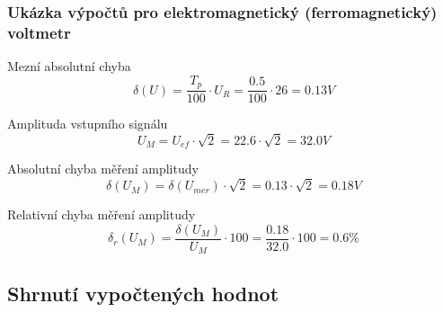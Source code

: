 \documentclass{praktikum}
\begin{document}
\subsubsection{Ukázka výpočtů pro elektromagnetický (ferromagnetický) voltmetr}
Mezní absolutní chyba
\begin{equation}
\label{eqn:vypocet_jedno_meznichyba}
\delta (U) = \frac{T_p}{100}\cdot U_R = \frac{0.5}{100}\cdot 26=0.13V
\end{equation}

Amplituda vstupního signálu
\begin{equation}
\label{eqn:vypocet_jedno_amplituda}
U_M = U_{ef} \cdot \sqrt{2} = 22.6 \cdot \sqrt{2} = 32.0V
\end{equation}

Absolutní chyba měření amplitudy
\begin{equation}
\label{eqn:vypocet_jedno_abschyba_amp}
\delta (U_M) = \delta (U_{mer}) \cdot \sqrt{2} = 0.13 \cdot\sqrt{2} = 0.18V
\end{equation}

Relativní chyba měření amplitudy
\begin{equation}
\label{eqn:vypocet_jedno_relchyba_amp}
\delta _r (U_M) = \frac{\delta (U_M)}{U_M}\cdot 100 = \frac{0.18}{32.0}\cdot 100 = 0.6 \%
\end{equation}

\subsection{Shrnutí vypočtených hodnot}
\end{document}
